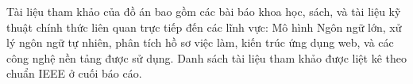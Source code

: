 \documentclass[../DoAn.tex]{subfiles}
\begin{document}
Tài liệu tham khảo của đồ án bao gồm các bài báo khoa học, sách, và tài liệu kỹ thuật chính thức liên quan trực tiếp đến các lĩnh vực: Mô hình Ngôn ngữ lớn, xử lý ngôn ngữ tự nhiên, phân tích hồ sơ việc làm, kiến trúc ứng dụng web, và các công nghệ nền tảng được sử dụng. Danh sách tài liệu tham khảo được liệt kê theo chuẩn IEEE ở cuối báo cáo.
\end{document}
